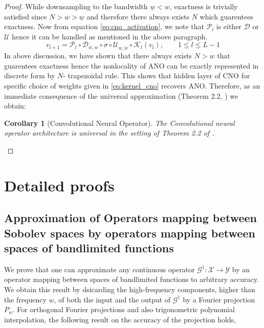 \documentclass[reqno,10pt]{amsart}
\theoremstyle{plain}
\newtheorem{cor}{Corollary}
\theoremstyle{definition}
\newcommand{\cal}[1]{\mathcal{#1}}
\begin{document}
\begin{proof}
        \noindent While downsampling to the bandwidth $\underline{w} < w$, exactness is trivially satisfied since $N > w > \underline{w}$ and therefore there always exists $N$ which guarentees exactness. Now from equation \ref{eq:cno_activation}, we note that $\cal P_l$ is either $\cal D$ or $\cal U$ hence it can be handled as mentioned in the above paragraph.
        $$ v_{l+1} = \cal P_l \circ \cal D_{\overline{w},w} \circ \sigma \circ \cal U_{w,\tilde{w}} \circ \cal K_l(v_l), \qquad 1 \leq l \leq L-1 $$
        In above discussion, we have shown that there always exists $N > w$ that guarentees exactness hence the nonlocality of ANO can be exactly represented in discrete form by $N$- trapezoidal rule. This shows that hidden layer of CNO for specific choice of weights given in \ref{eq:kernel_cno} recovers ANO. Therefore, as an immediate consequence of the universal approximation (Theorem 2.2, \cite{SL2024}) we obtain:
        \begin{cor}[Convolutional Neural Operator]
            The Convolutional neural operator architecture is universal in the setting of Theorem 2.2 of \cite{SL2024}.
        \end{cor}
    \end{proof}















    \appendix
    \section{\bf Detailed proofs}
    \subsection[A.1]{Approximation of Operators mapping between Sobolev spaces by operators mapping between spaces of bandlimited functions} \label{appendix:A.1}
    We prove that one can approximate any continuous operator $\cal G^\dag : \cal X \to \cal Y$ by an operator mapping between spaces of bandlimited functions to arbitrary accuracy. We obtain this result by dsicarding the high-frequency components, higher than the frequency $w$, of both the input and the output of $\cal G^\dag$ by a Fourier projection $P_w$. For orthogonal Fourier projections and also trigonometric polynomial interpolation, the following result on the accuracy of the projection holds,
\end{document}
